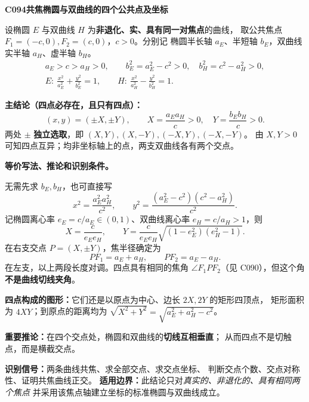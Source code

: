 \begin{statementbox}
\textbf{C094\quad 共焦椭圆与双曲线的四个公共点及坐标}

设椭圆 $E$ 与双曲线 $H$ 为\textbf{非退化、实、具有同一对焦点}的曲线，
取公共焦点 $F_1=(-c,0),F_2=(c,0)$，$c>0$。分别记
椭圆半长轴 $a_E$、半短轴 $b_E$，双曲线实半轴 $a_H$、虚半轴 $b_H$。
\[
\begin{gathered}
 a_E>c>a_H>0,\qquad
 b_E^2=a_E^2-c^2>0,\quad b_H^2=c^2-a_H^2>0,\\
 E:\ \frac{x^2}{a_E^2}+\frac{y^2}{b_E^2}=1,\qquad
 H:\ \frac{x^2}{a_H^2}-\frac{y^2}{b_H^2}=1.
\end{gathered}
\]
\begin{center}

\end{center}
\textbf{主结论（四点必存在，且只有四点）：}
\[
\boxed{(x,y)=(\pm X,\pm Y),\qquad
 X=\frac{a_Ea_H}{c}>0,\quad
 Y=\frac{b_Eb_H}{c}>0.}
\]
两处 $\pm$ \textbf{独立选取}，即 $(X,Y),(X,-Y),(-X,Y),(-X,-Y)$。
由 $X,Y>0$ 可知四点互异；均非坐标轴上的点，两支双曲线各有两个交点。
\end{statementbox}

\clearpage
\begin{statementbox}
\textbf{等价写法、推论和识别条件。}

无需先求 $b_E,b_H$，也可直接写
\[
\boxed{x^2=\frac{a_E^2a_H^2}{c^2}},\qquad
\boxed{y^2=\frac{(a_E^2-c^2)(c^2-a_H^2)}{c^2}}.
\]
记椭圆离心率 $e_E=c/a_E\in(0,1)$、双曲线离心率
$e_H=c/a_H>1$，则
\[
\boxed{X=\frac{c}{e_Ee_H}},\qquad
\boxed{Y=\frac{c}{e_Ee_H}
\sqrt{(1-e_E^2)(e_H^2-1)}}.
\]
在右支交点 $P=(X,\pm Y)$，焦半径确定为
\[
PF_1=a_E+a_H,\qquad PF_2=a_E-a_H.
\]
在左支，以上两段长度对调。四点具有相同的焦角
$\angle F_1PF_2$（见 C090），但这个角\textbf{不是曲线切线夹角}。

\textbf{四点构成的图形：}它们还是以原点为中心、边长 $2X,2Y$ 的矩形四顶点，
矩形面积为 $4XY$；到原点的距离均为
$\sqrt{X^2+Y^2}=\sqrt{a_E^2+a_H^2-c^2}$。

\textbf{重要推论：}在四个交点处，椭圆和双曲线的\textbf{切线互相垂直}；
从而四点不是切触点，而是横截交点。

\textbf{识别信号：}两条曲线共焦、求全部交点、求交点坐标、
判断交点个数、交点对称性、证明共焦曲线正交。
\textbf{适用边界：}此结论只对\emph{真实的、非退化的、具有相同两个焦点}
并采用该焦点轴建立坐标的标准椭圆与双曲线成立。
\end{statementbox}

